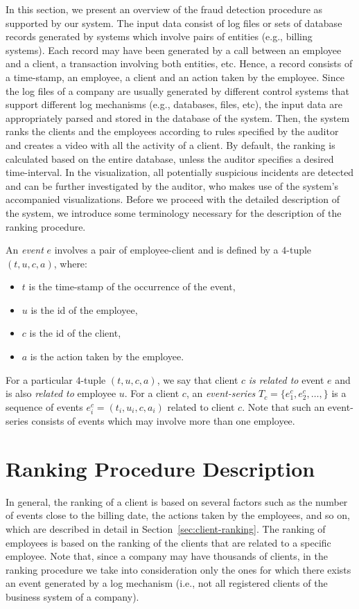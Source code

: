 \documentclass[conference]{IEEEtran}
\begin{document}
In this section, we present an overview of the fraud detection
procedure as supported by our system. The input data consist of log
files or sets of database records generated by systems which involve
pairs of entities (e.g., billing systems). Each record may have been
generated by a call between an employee and a client, a transaction
involving both entities, etc. Hence, a record consists of a
time-stamp, an employee, a client and an action taken by the
employee. Since the log files of a company are usually generated by
different control systems that support different log mechanisms
(e.g., databases, files, etc), the input data are appropriately
parsed and stored in the database of the system. Then, the system
ranks the clients and the employees according to rules specified by
the auditor and creates a video with all the activity of a client.
By default, the ranking is calculated based on the entire database,
unless the auditor specifies a desired time-interval. In the
visualization, all potentially suspicious incidents are detected and
can be further investigated by the auditor, who makes use of the
system's accompanied visualizations. Before we proceed with the
detailed description of the system, we introduce some terminology
necessary for the description of the ranking procedure.

An \emph{event} $e$ involves a pair of employee-client and is
defined by a $4$-tuple $(t,u,c,a)$, where:
\begin{itemize}
  \item $t$ is the time-stamp of the occurrence of the event,
  \item $u$ is the id of the employee,
  \item $c$ is the id of the client,
  \item $a$ is the action taken by the employee.
\end{itemize}
For a particular $4$-tuple $(t,u,c,a)$, we say that client $c$
\emph{is related to} event $e$ and is also \emph{related to}
employee $u$. For a client $c$, an \emph{event-series} $T_c =
\{e_1^c, e_2^c, \ldots, \}$ is a sequence of events
$e_i^c=(t_i,u_i,c,a_i)$ related to client $c$. Note that such an
event-series consists of events which may involve more than one
employee.


\section{Ranking Procedure Description}
\label{sec:ranking}

In general, the ranking of a client is based on several factors such
as the number of events close to the billing date, the actions taken
by the employees, and so on, which are described in detail in
Section~\ref{sec:client-ranking}. The ranking of employees is based
on the ranking of the clients that are related to a specific
employee. Note that, since a company may have thousands of clients,
in the ranking procedure we take into consideration only the ones
for which there exists an event generated by a log mechanism (i.e.,
not all registered clients of the business system of a company).
\end{document}
